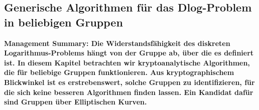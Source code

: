 \begin{refsegment}
\newpage
\section{Generische Algorithmen für das Dlog-Problem in beliebigen Gruppen}
\label{generic}

\textbf{Management Summary: Die Widerstandsfähigkeit des diskreten Logarithmus-Pro\-b\-lems
hängt von der Gruppe ab, über die es definiert ist. In diesem Kapitel betrachten wir kryptoanalytische Algorithmen, die für beliebige Gruppen funktionieren. Aus kryptographischem Blickwinkel ist es erstrebenswert, solche Gruppen zu identifizieren, für die sich keine besseren Algorithmen finden lassen. Ein Kandidat dafür sind Gruppen über Elliptischen Kurven.\\[0.1cm]}


\end{refsegment}
